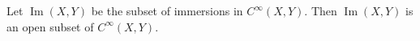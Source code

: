 Let $\operatorname{Im}(X, Y)$ be the subset of immersions in $C^\infty(X, Y)$. Then $\operatorname{Im}(X, Y)$ is an open subset of $C^\infty(X, Y)$.
